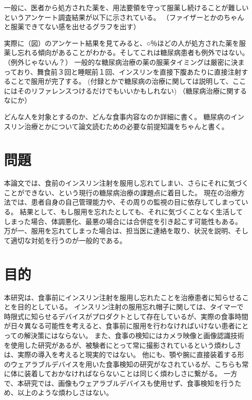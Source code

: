 一般に、医者から処方された薬を、用法要領を守って服薬し続けることが難しいというアンケート調査結果が以下に示されている。
（ファイザーとかのちゃんと服薬できてない感を出せるグラフを出す）

実際に（図）のアンケート結果を見てみると、○％ほどの人が処方された薬を服薬し忘れる傾向があることがわかる。そしてこれは糖尿病患者も例外ではない。（例外じゃないん？）
一般的な糖尿病治療の薬の服薬タイミングは厳密に決まっており、舞食前３回と睡眠前１回、インスリンを直接下腹あたりに直接注射することで服用が完了する。
(付録とかで糖尿病の治療に関しては説明して、ここにはそのリファレンスつけるだけでもいいかもしれない)
（糖尿病治療に関するなにか）

どんな人を対象とするのか、どんな食事内容なのか詳細に書く。
糖尿病のインスリン治療とかについて論文読むための必要な前提知識をちゃんと書く。

\section{問題}
\label{section:problem}

本論文では、食前のインスリン注射を服用し忘れてしまい、さらにそれに気づくことができない、という現行の糖尿病治療の課題点に着目した。
現在の治療方法では、患者自身の自己管理能力や、その周りの監視の目に依存してしまっている。
結果として、もし服用を忘れたとしても、それに気づくことなく生活してしまった場合、体調悪化、最悪の場合には合併症を引き起こす可能性もある。
万が一、服用を忘れてしまった場合は、担当医に連絡を取り、状況を説明、そして適切な対処を行うのが一般的である。

\section{目的}
\label{section:purpose}

本研究は、食事前にインスリン注射を服用し忘れたことを治療患者に知らせることを目的としている。
インスリン注射の服用忘れ帽子に関しては、タイマーで時限式に知らせるデバイスがプロダクトとして存在しているが、実際の食事時間が日々異なる可能性を考えると、食事前に服用を行わなければいけない患者にとっての解決策にはならない。
また、食事の検知にはカメラ映像と画像認識技術を使用した研究があるが、被験者にとって常に撮影されているという煩わしさは、実際の導入を考えると現実的ではない。
他にも、顎や腕に直接装着する形のウェアラブルデバイスを用いた食事検知の研究がなされているが、こちらも常に体に装着しておかなければならないことは同じく煩わしさに繋がる。
一方で、本研究では、画像もウェアラブルデバイスも使用せず、食事検知を行うため、以上のような煩わしさはない。

